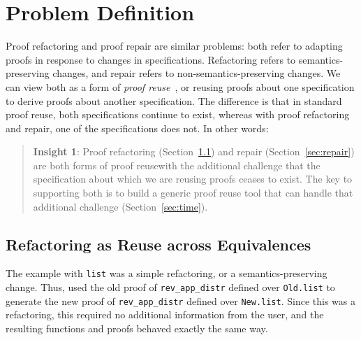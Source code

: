 \section{Problem Definition}
\label{sec:key1}

Proof refactoring and proof repair are similar problems: both refer to adapting proofs in response to changes
in specifications. Refactoring refers to semantics-preserving changes, and repair refers to non-semantics-preserving
changes. We can view both as a form of 
\textit{proof reuse}~\cite{Ringer2019, felty1994generalization, caplan1995logical, pons2000generalization, johnsen2004theorem}, %
or reusing proofs about one specification to derive proofs about another specification.
The difference is that in standard proof reuse, both specifications continue to exist, whereas with proof refactoring and repair,
one of the specifications does not.
In other words:

\begin{quote}
\textbf{Insight 1}:
Proof refactoring (Section~\ref{sec:refactoring}) and repair (Section~\ref{sec:repair}) are both forms of proof reusewith the additional
challenge that the specification about which
we are reusing proofs ceases to exist.
The key to supporting both is to build a generic proof reuse
tool that can handle that additional challenge (Section~\ref{sec:time}). 
\end{quote}

\subsection{Refactoring as Reuse across Equivalences}
\label{sec:refactoring}

The example with \lstinline{list} was a simple refactoring, or a semantics-preserving change.
Thus, \toolname used the old proof of \lstinline{rev_app_distr} defined over \lstinline{Old.list}
to generate the new proof of \lstinline{rev_app_distr} defined over \lstinline{New.list}.
Since this was a refactoring, this required no additional information from the user, and the resulting functions
and proofs behaved exactly the same way.

